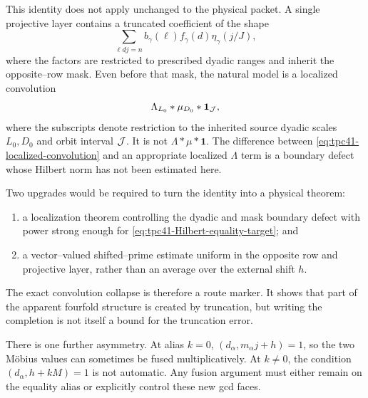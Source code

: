 This identity does not apply unchanged to the physical packet.  A single
projective layer contains a truncated coefficient of the shape
\begin{equation}
 \sum_{\ell dj=n}
 b_\gamma(\ell)f_\gamma(d)\eta_\gamma(j/J),
 \label{eq:tpc41-truncated-convolution}
\end{equation}
where the factors are restricted to prescribed dyadic ranges and inherit
the opposite--row mask.  Even before that mask, the natural model is a
localized convolution
\begin{equation}
 \Lambda_{L_0}*\mu_{D_0}*\mathbf1_{\mathcal J},
 \label{eq:tpc41-localized-convolution}
\end{equation}
where the subscripts denote restriction to the inherited source dyadic
scales \(L_0,D_0\) and orbit interval \(\mathcal J\).  It is not
\(\Lambda*\mu*\mathbf1\).  The difference between
\eqref{eq:tpc41-localized-convolution} and an appropriate localized
\(\Lambda\) term is a boundary defect whose Hilbert norm has not been
estimated here.

Two upgrades would be required to turn the identity into a physical
theorem:
\begin{enumerate}[label=(\roman*)]
 \item a localization theorem controlling the dyadic and mask boundary
 defect with power strong enough for
 \eqref{eq:tpc41-Hilbert-equality-target}; and
 \item a vector--valued shifted--prime estimate uniform in the opposite
 row and projective layer, rather than an average over the external shift
 \(h\).
\end{enumerate}
The exact convolution collapse is therefore a route marker.  It shows
that part of the apparent fourfold structure is created by truncation,
but writing the completion is not itself a bound for the truncation
error.

There is one further asymmetry.  At alias \(k=0\),
\((d_\alpha,m_\alpha j+h)=1\), so the two M\"obius values can sometimes be
fused multiplicatively.  At \(k\ne0\), the condition
\((d_\alpha,h+kM)=1\) is not automatic.  Any fusion argument must either
remain on the equality alias or explicitly control these new gcd faces.
